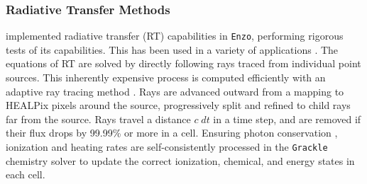 \documentclass[11pt]{article}
\begin{document}
\subsubsection{Radiative Transfer Methods}


\cite{WiseAbel2011} implemented radiative transfer (RT) capabilities in \texttt{Enzo}, performing rigorous tests of its capabilities. This has been used in a variety of applications \citep[e.g.][]{WiseAbel2012,Wise2012a,Wise2014, Smith2015, OShea2015, Koh2016, Regan2016a, Regan2016b}. The equations of RT are solved by directly following rays traced from individual point sources. This inherently expensive process is computed efficiently with an adaptive ray tracing method \citep{AbelWandelt2002}. Rays are advanced outward from a mapping to HEALPix pixels around the source, progressively split and refined to child rays far from the source. Rays travel a distance $c\; dt$ in a time step, and are removed if their flux drops by 99.99\% or more in a cell. Ensuring photon conservation \citep{Abel1999,Mellema2006}, ionization and heating rates are self-consistently processed in the \texttt{Grackle} chemistry solver to update the correct ionization, chemical, and energy states in each cell.
\end{document}
